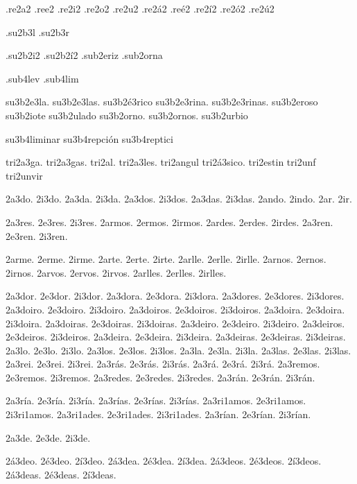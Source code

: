 {{%
.re2a2 .ree2 .re2i2 .re2o2 .re2u2 .re2^^e12 .re^^e92 .re2^^ed2 .re2^^f32 .re2^^fa2 

.su2b3l .su2b3r 

.su2b2i2 
.su2b2^^ed2 
.sub2eriz 
.sub2orna 

.sub4lev 
.sub4lim 

su3b2e3la. 
su3b2e3las. 
su3b2^^e93rico 
su3b2e3rina. 
su3b2e3rinas. 
su3b2eroso 
su3b2iote 
su3b2ulado 
su3b2orno. 
su3b2ornos. 
su3b2urbio 

su3b4liminar 
su3b4repci^^f3n 
su3b4reptici 


tri2a3ga. 
tri2a3gas. 
tri2al. 
tri2a3les. 
tri2angul 
tri2^^e13sico. 
tri2estin 
tri2unf 
tri2unvir 


2a3do. 2i3do. 
2a3da. 2i3da. 
2a3dos. 2i3dos. 
2a3das. 2i3das. 
2ando. 2indo. 
2ar. 2ir. 

2a3res. 2e3res. 2i3res. 
2armos. 2ermos. 2irmos. 
2ardes. 2erdes. 2irdes. 
2a3ren. 2e3ren. 2i3ren. 

2arme. 2erme. 2irme. 
2arte. 2erte. 2irte. 
2arlle. 2erlle. 2irlle. 
2arnos. 2ernos. 2irnos. 
2arvos. 2ervos. 2irvos. 
2arlles. 2erlles. 2irlles. 

2a3dor. 2e3dor. 2i3dor. 
2a3dora. 2e3dora. 2i3dora. 
2a3dores. 2e3dores. 2i3dores. 
2a3doiro. 2e3doiro. 2i3doiro. 
2a3doiros. 2e3doiros. 2i3doiros. 
2a3doira. 2e3doira. 2i3doira. 
2a3doiras. 2e3doiras. 2i3doiras. 
2a3deiro. 2e3deiro. 2i3deiro. 
2a3deiros. 2e3deiros. 2i3deiros. 
2a3deira. 2e3deira. 2i3deira. 
2a3deiras. 2e3deiras. 2i3deiras. 
2a3lo. 2e3lo. 2i3lo. 
2a3los. 2e3los. 2i3los. 
2a3la. 2e3la. 2i3la. 
2a3las. 2e3las. 2i3las. 
2a3rei. 2e3rei. 2i3rei. 
2a3r^^e1s. 2e3r^^e1s. 2i3r^^e1s. 
2a3r^^e1. 2e3r^^e1. 2i3r^^e1. 
2a3remos. 2e3remos. 2i3remos. 
2a3redes. 2e3redes. 2i3redes. 
2a3r^^e1n. 2e3r^^e1n. 2i3r^^e1n. 

2a3r^^eda. 2e3r^^eda. 2i3r^^eda. 
2a3r^^edas. 2e3r^^edas. 2i3r^^edas. 
2a3ri1amos. 2e3ri1amos. 2i3ri1amos. 
2a3ri1ades. 2e3ri1ades. 2i3ri1ades. 
2a3r^^edan. 2e3r^^edan. 2i3r^^edan. 

2a3de. 2e3de. 2i3de. 

2^^e13deo. 2^^e93deo. 2^^ed3deo. 
2^^e13dea. 2^^e93dea. 2^^ed3dea. 
2^^e13deos. 2^^e93deos. 2^^ed3deos. 
2^^e13deas. 2^^e93deas. 2^^ed3deas. 

}}
